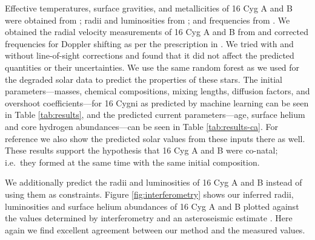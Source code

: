 \documentclass[manuscript,linenumbers]{aastex6}
\begin{document}
Effective temperatures, surface gravities, and metallicities of 16 Cyg A and B were obtained from \citet{2009AA...508L..17R}; radii and luminosities from \citet{2013MNRAS.433.1262W}; and frequencies from \citet{2015MNRAS.446.2959D}. We obtained the radial velocity measurements of 16 Cyg A and B from \citet{2002ApJS..141..503N} and corrected frequencies for Doppler shifting as per the prescription in \citet{2014MNRAS.445L..94D}. We tried with and without line-of-sight corrections and found that it did not affect the predicted quantities or their uncertainties. We use the same random forest as we used for the degraded solar data to predict the properties of these stars. The initial parameters---masses, chemical compositions, mixing lengths, diffusion factors, and overshoot coefficients---for 16 Cygni as predicted by machine learning can be seen in Table \ref{tab:results}, and the predicted current parameters---age, surface helium and core hydrogen abundances---can be seen in Table \ref{tab:results-ca}. For reference we also show the predicted solar values from these inputs there as well. These results support the hypothesis that 16 Cyg A and B were co-natal; i.e.\ they formed at the same time with the same initial composition. 

We additionally predict the radii and luminosities of 16 Cyg A and B instead of using them as constraints. Figure \ref{fig:interferometry} shows our inferred radii, luminosities and surface helium abundances of 16 Cyg A and B plotted against the values determined by interferometry \citep{2013MNRAS.433.1262W} and an asteroseismic estimate \citep{2014ApJ...790..138V}. Here again we find excellent agreement between our method and the measured values. 
\end{document}
